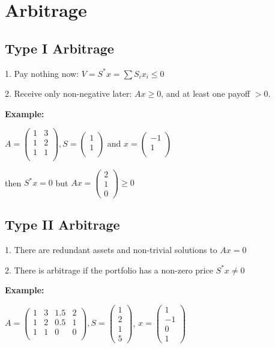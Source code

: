 \section{Arbitrage}

\subsection{Type I Arbitrage}

1. Pay nothing now:
$V = S^* x = \sum S_i x_i \leq 0$

2. Receive only non-negative later: $A x \geq 0$, and at least one payoff $> 0$.

\textbf{Example:} 

$A = \begin{pmatrix} 1 & 3 \\ 1 & 2 \\ 1 & 1 \\\end{pmatrix}, S = \begin{pmatrix}  1 \\ 1 \\\end{pmatrix}$ and $x = \begin{pmatrix}  -1 \\ 1 \\\end{pmatrix}$

then $S^*x = 0$ but $Ax = \begin{pmatrix}  2 \\ 1 \\ 0 \end{pmatrix} \geq 0$

\subsection{Type II Arbitrage}

1. There are redundant assets and non-trivial solutions to $Ax = 0$

2. There is arbitrage if the portfolio has a non-zero price $S^* x \neq 0$

\textbf{Example:}

$A = \begin{pmatrix} 1 & 3 & 1.5 & 2\\ 1 & 2 & 0.5 & 1 \\ 1 & 1 & 0 & 0 \\\end{pmatrix}, S = \begin{pmatrix}  1 \\ 2 \\ 1 \\ 5 \end{pmatrix}$, $x = \begin{pmatrix}  1 \\ -1 \\ 0 \\ 1\end{pmatrix}$

